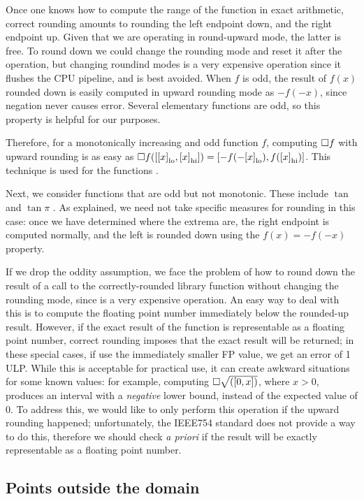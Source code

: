 Once one knows how to compute the range of the function in exact arithmetic, correct rounding amounts to rounding the left endpoint down, and the right endpoint up. Given that we are operating in round-upward mode, the latter is free. To round down we could change the rounding mode and reset it after the operation, but changing roundind modes is a very expensive operation since it flushes the CPU pipeline, and is best avoided.
When $f$ is odd, the result of $f(x)$ rounded down is easily computed in upward rounding mode as $-f(-x)$, since negation never causes error. Several elementary functions are odd, so this property is helpful for our purposes.

Therefore, for a monotonically increasing and odd function $f$, computing $\Box f$ with upward rounding is as easy as $\Box f([{[x]}_{\textrm{lo}}, {[x]}_{\textrm{hi}}]) = [-f(-{[x]}_{\textrm{lo}}), f({[x]}_{\textrm{hi}})]$. This technique is used for the functions .

Next, we consider functions that are odd but not monotonic. These include $\tan$ and $\tan\pi$ . As explained, we need not take specific measures for rounding in this case: once we have determined where the extrema are, the right endpoint is computed normally, and the left is rounded down using the $f(x) = -f(-x)$ property. %

If we drop the oddity assumption, we face the problem of how to round down the result of a call to the correctly-rounded library function without changing the rounding mode, since is a very expensive operation.
An easy way to deal with this is to compute the floating point number immediately below the rounded-up result.
However, if the exact result of the function is representable as a floating point number, correct rounding imposes that the exact result will be returned; in these special cases, if use the immediately smaller FP value, we get an error of 1 ULP.
While this is acceptable for practical use, it can create awkward situations for some known values: for example, computing $\Box \sqrt{([0,x])}$, where $x>0$, produces an interval with a \emph{negative} lower bound, instead of the expected value of 0.
To address this, we would like to only perform this operation if the upward rounding happened; unfortunately, the IEEE754 standard does not provide a way to do this, therefore we should check \emph{a priori} if the result will be exactly representable as a floating point number.

\FS{\dots}

\subsection{Points outside the domain}
